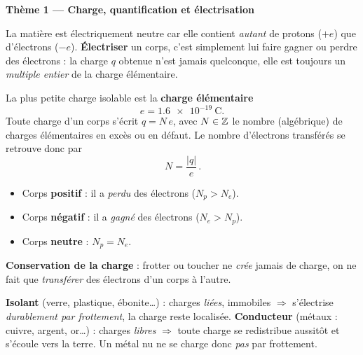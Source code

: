 \documentclass[11pt,a4paper]{article}
\begin{document}

\begin{center}\large\bfseries\color{primarydark}
Thème 1 — Charge, quantification et électrisation
\end{center}

La matière est électriquement neutre car elle contient \emph{autant} de protons ($+e$) que
d'électrons ($-e$). \textbf{Électriser} un corps, c'est simplement lui faire gagner ou perdre des
électrons : la charge $q$ obtenue n'est jamais quelconque, elle est toujours un \emph{multiple
entier} de la charge élémentaire.

\begin{cle}
La plus petite charge isolable est la \textbf{charge élémentaire}
\[ e = \num{1.6e-19}\ \si{\coulomb}. \]
Toute charge d'un corps s'écrit $q = N\,e$, avec $N \in \mathbb{Z}$ le nombre (algébrique) de charges
élémentaires en excès ou en défaut. Le nombre d'électrons transférés se retrouve donc par
\[ \boxed{\,N = \dfrac{|q|}{e}\,}. \]
\end{cle}

\begin{cle}[signe de la charge = un simple comptage]
\begin{itemize}[leftmargin=1.5em,topsep=1pt,itemsep=1pt]
  \item Corps \textbf{positif} : il a \emph{perdu} des électrons ($N_p > N_e$).
  \item Corps \textbf{négatif} : il a \emph{gagné} des électrons ($N_e > N_p$).
  \item Corps \textbf{neutre} : $N_p = N_e$.
\end{itemize}
\textbf{Conservation de la charge} : frotter ou toucher ne \emph{crée} jamais de charge, on ne fait
que \emph{transférer} des électrons d'un corps à l'autre.
\end{cle}

\begin{cle}
\textbf{Isolant} (verre, plastique, ébonite\dots) : charges \emph{liées}, immobiles $\Rightarrow$
s'électrise \emph{durablement par frottement}, la charge reste localisée.
\textbf{Conducteur} (métaux : cuivre, argent, or\dots) : charges \emph{libres} $\Rightarrow$ toute
charge se redistribue aussitôt et s'écoule vers la terre. Un métal nu ne se charge donc \emph{pas}
par frottement.
\end{cle}
\end{document}
